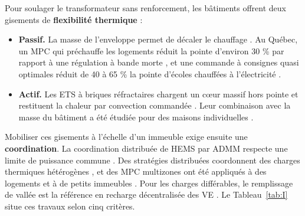 \documentclass[conference]{IEEEtran}
\providecommand{\tightlist}{\setlength{\itemsep}{0pt}\setlength{\parskip}{0pt}}
\begin{document}
Pour soulager le transformateur sans renforcement, les bâtiments offrent deux gisements de \textbf{flexibilité thermique} :

\begin{itemize}
\tightlist
\item
  \textbf{Passif.} La masse de l'enveloppe permet de décaler le chauffage \cite{LeDreau2016, Reynders2013, LiH2021, Hristov2026}. Au Québec, un MPC qui préchauffe les logements réduit la pointe d'environ 30 \% par rapport à une régulation à bande morte \cite{Vallianos2023}, et une commande à consignes quasi optimales réduit de 40 à 65 \% la pointe d'écoles chauffées à l'électricité \cite{Morovat2022}.
\item
  \textbf{Actif.} Les ETS à briques réfractaires chargent un cœur massif hors pointe et restituent la chaleur par convection commandée \cite{Guzman2015, Devia2021, Xu2018ETS}. Leur combinaison avec la masse du bâtiment a été étudiée pour des maisons individuelles \cite{EtedadiAliabadi2022}.
\end{itemize}

Mobiliser ces gisements à l'échelle d'un immeuble exige ensuite une \textbf{coordination}. La coordination distribuée de HEMS par ADMM respecte une limite de puissance commune \cite{Etedadi2023, Etedadi2025}. Des stratégies distribuées coordonnent des charges thermiques hétérogènes \cite{Zheng2024}, et des MPC multizones ont été appliqués à des logements et à de petits immeubles \cite{Frahm2025, Hasrat2025}. Pour les charges différables, le remplissage de vallée est la référence en recharge décentralisée des VE \cite{Gan2013}. Le Tableau~\ref{tab:I} situe ces travaux selon cinq critères.
\end{document}
